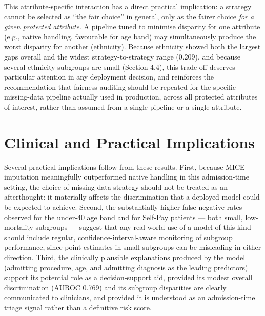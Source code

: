 \documentclass[12pt,a4paper]{report}
\begin{document}
This attribute-specific interaction has a direct practical implication: a strategy cannot be selected as ``the fair choice'' in general, only as the fairer choice \emph{for a given protected attribute}. A pipeline tuned to minimise disparity for one attribute (e.g., native handling, favourable for age band) may simultaneously produce the worst disparity for another (ethnicity). Because ethnicity showed both the largest gaps overall and the widest strategy-to-strategy range (0.209), and because several ethnicity subgroups are small (Section 4.4), this trade-off deserves particular attention in any deployment decision, and reinforces the recommendation that fairness auditing should be repeated for the specific missing-data pipeline actually used in production, across all protected attributes of interest, rather than assumed from a single pipeline or a single attribute.


\section{Clinical and Practical Implications}
Several practical implications follow from these results. First, because MICE imputation meaningfully outperformed native handling in this admission-time setting, the choice of missing-data strategy should not be treated as an afterthought: it materially affects the discrimination that a deployed model could be expected to achieve. Second, the substantially higher false-negative rates observed for the under-40 age band and for Self-Pay patients --- both small, low-mortality subgroups --- suggest that any real-world use of a model of this kind should include regular, confidence-interval-aware monitoring of subgroup performance, since point estimates in small subgroups can be misleading in either direction. Third, the clinically plausible explanations produced by the model (admitting procedure, age, and admitting diagnosis as the leading predictors) support its potential role as a decision-support aid, provided its modest overall discrimination (AUROC 0.769) and its subgroup disparities are clearly communicated to clinicians, and provided it is understood as an admission-time triage signal rather than a definitive risk score.
\end{document}
